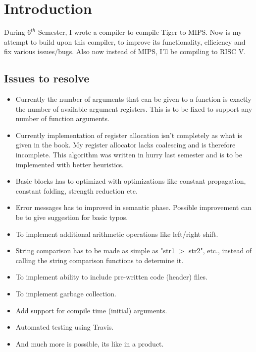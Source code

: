 \chapter{Introduction}
\hspace{3mm}

During $6^{th}$ Semester, I wrote a compiler to compile Tiger to MIPS. Now is my attempt to build upon this compiler, to improve its functionality, efficiency and fix various issues/bugs. Also now instead of MIPS, I'll be compiling to RISC V.

\section{Issues to resolve}

\begin{itemize}
  \item Currently the number of arguments that can be given to a function is exactly the number of available argument registers. This is to be fixed to support any number of function arguments.
  \item Currently implementation of register allocation isn't completely as what is given in the book. My register allocator lacks coalescing and is therefore incomplete. This algorithm was written in hurry last semester and is to be implemented with better heuristics.
  \item Basic blocks has to optimized with optimizations like constant propagation, constant folding, strength reduction etc.
  \item Error messages has to improved in semantic phase. Possible improvement can be to give suggestion for basic typos. 
  \item To implement additional arithmetic operations like left/right shift.
  \item String comparison has to be made as simple as "str1 $>$ str2", etc.,  instead of calling the string comparison functions to determine it.
  \item To implement ability to include pre-written code (header) files.
  \item To implement garbage collection.
  \item Add support for compile time (initial) arguments.
  \item Automated testing using Travis.
  \item And much more is possible, its like in a product.
\end{itemize}

